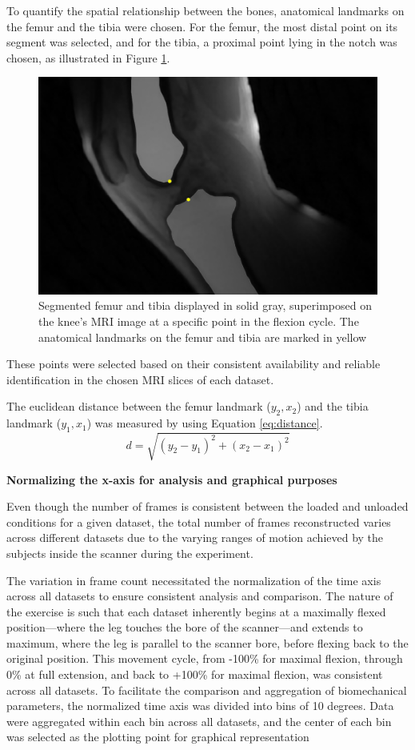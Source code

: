 \documentclass{micro-econ-thesis}
\begin{document}
To quantify the spatial relationship between the bones, anatomical landmarks on the femur and the tibia were chosen. For the femur, the most distal point on its segment was selected, and for the tibia, a  proximal point lying in the notch was chosen, as illustrated in Figure \ref{fig:twopoints}.   
\begin{figure}[H]
	\centering
	\includegraphics[width=0.7\linewidth]{two_points}
	\caption{Segmented femur and tibia displayed in solid gray, superimposed on the knee's MRI image at a specific point in the flexion cycle. The anatomical landmarks on the femur and tibia are marked in yellow}
	\label{fig:twopoints}
\end{figure}

These points were selected based on their consistent availability and reliable identification in the chosen MRI slices of each dataset.

The euclidean distance between the femur landmark ($y_2, x_2$) and the tibia landmark ($y_1, x_1$) was measured by using Equation \ref{eq:distance}. 
\begin{equation}
	d = \sqrt{(y_2 - y_1)^2 + (x_2 - x_1)^2}
	\label{eq:distance}
\end{equation} 


\textbf{Normalizing the x-axis for analysis and graphical purposes}

Even though the number of frames is consistent between the loaded and unloaded conditions for a given dataset, the total number of frames reconstructed varies across different datasets due to the varying ranges of motion achieved by the subjects inside the scanner during the experiment. 

The variation in frame count necessitated the normalization of the time axis across all datasets to ensure consistent analysis and comparison. The nature of the exercise is such that each dataset inherently begins at a maximally flexed position—where the leg touches the bore of the scanner—and extends to maximum, where the leg is parallel to the scanner bore, before flexing back to the original position. This movement cycle, from -100\% for maximal flexion, through 0\% at full extension, and back to +100\% for maximal flexion, was consistent across all datasets. To facilitate the comparison and aggregation of biomechanical parameters, the normalized time axis was divided into bins of 10 degrees. Data were aggregated within each bin across all datasets, and the center of each bin was selected as the plotting point for graphical representation
\end{document}
